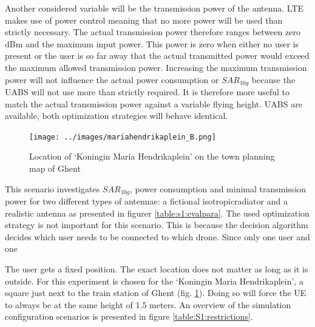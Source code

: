 Another considered variable will be the transmission power of the antenna.
\gls{LTE} makes use of power control meaning that no more power will be used than strictly necessary. The actual 
transmission power therefore ranges between zero dBm and the maximum input power. This power is zero when either no user is 
present or the user is so far away that the actual transmitted power would exceed the maximum allowed transmission power.
Increasing the maximum transmission power will not influence the actual power consumption or $SAR_{10g}$ because the \gls{UABS} will not use more
than strictly required. It is therefore more useful to match the actual transmission power against a variable flying height.
\gls{UABS} are available, both optimization strategies will behave identical. 

\begin{figure}
  \begin{center}
    \texttt{[image: ../images/mariahendrikaplein\_B.png]}
  \end{center}
 \caption{Location of `Koningin Maria Hendrikaplein' on the town planning map of Ghent}
  \label{fig:locationHendrikaplein}
\end{figure}
This scenario investigates $SAR_{10g}$, power consumption and minimal transmission power for two different types of antennae: a 
 fictional \gls{isotropicradiator} and a realistic antenna as presented in figurer \ref{table:s1:evalpara}.
 The used optimization strategy is not important
for this scenario.
This is because the
 decision algorithm decides which user needs to be connected to which drone. Since only one user and one


The user gets a fixed position. The exact location does not matter as long as it is outside. For this experiment is chosen for the 
`Koningin Maria Hendrikaplein', a square just next to the train station of Ghent (fig. \ref{fig:locationHendrikaplein}).  Doing so will force the \gls{UE} 
to always be at the same height of 1.5 meters. 
An overview of the simulation configuration scenarios is presented in figure \ref{table:S1:restrictions}.

